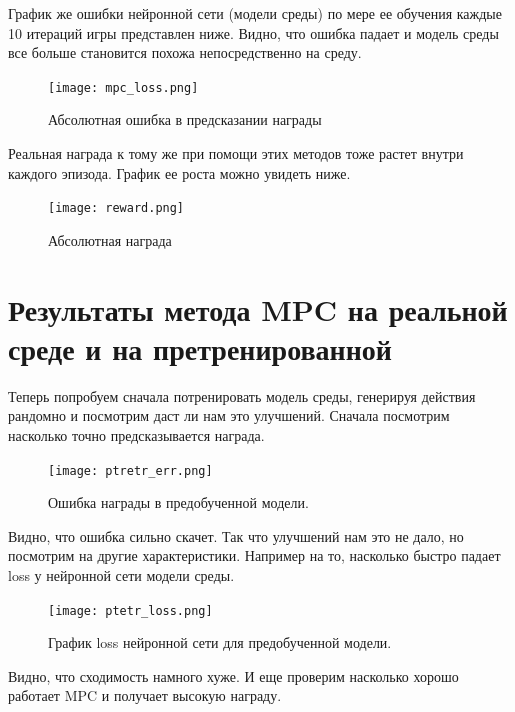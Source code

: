 График же ошибки нейронной сети (модели среды) по мере ее обучения каждые 10 итераций игры представлен ниже. Видно, что ошибка падает и модель среды все больше становится похожа непосредственно на среду. \newpage

\begin{figure}[!h]
	\caption {Абсолютная ошибка в предсказании награды}
	\centering
	\texttt{[image: mpc\_loss.png]}
	\label{fig:agent}
\end{figure}

Реальная награда к тому же при помощи этих методов тоже растет внутри каждого эпизода. График ее роста можно увидеть ниже. \newpage

\begin{figure}[!h]
	\caption {Абсолютная награда}
	\centering
	\texttt{[image: reward.png]}
	\label{fig:agent}
\end{figure}



\section{Результаты метода MPC на реальной среде и на претренированной }\label{1sec:optimal-control}


Теперь попробуем сначала потренировать модель среды, генерируя действия рандомно и посмотрим даст ли нам это улучшений. Сначала посмотрим насколько точно предсказывается награда. \newpage


\begin{figure}[!h]
	\caption {Ошибка награды в предобученной модели. }
	\centering
	\texttt{[image: ptretr\_err.png]}
	\label{fig:agent}
\end{figure}

Видно, что ошибка сильно скачет. Так что улучшений нам это не дало, но посмотрим на другие характеристики. Например на то, насколько быстро падает loss у нейронной сети модели среды. \newpage



\begin{figure}[!h]
	\caption {График loss нейронной сети для предобученной модели. }
	\centering
	\texttt{[image: ptetr\_loss.png]}
	\label{fig:agent}
\end{figure}


Видно, что сходимость намного хуже. И еще проверим насколько хорошо работает MPC и получает высокую награду. 


